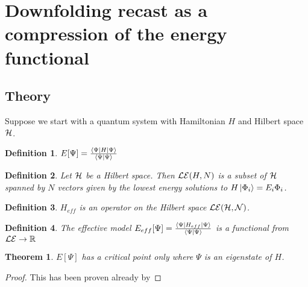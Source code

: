 \newtheorem{theorem}{Theorem}
\newtheorem{definition}{Definition}


\section{Downfolding recast as a compression of the energy functional}

\subsection{Theory} 

Suppose we start with a quantum system with Hamiltonian $H$ and Hilbert space ${\cal H}$.

\begin{definition}
$E[\Psi] = \frac{\bra{\Psi}H\ket{\Psi}}{\braket{\Psi|\Psi}}$
\end{definition}


\begin{definition}
Let ${\cal H}$ be a Hilbert space. Then ${\cal LE}(H,N)$ is a subset of ${\cal H}$ spanned by $N$ vectors given by the lowest energy solutions to $H\ket{\Phi_i}=E_i{\Phi_i}$. 
\end{definition}

\begin{definition}
$H_{eff}$ is an operator on the Hilbert space ${\cal LE(H,N)}$.	 
\end{definition}


\begin{definition}
The effective model $E_{eff}[\Psi]=\frac{\bra{\Psi}H_{eff}\ket{\Psi}}{\braket{\Psi|\Psi}}$ is a functional from ${\cal LE} \rightarrow \mathbb{R}$
\end{definition}



\begin{theorem}
\label{theorem:criticalpoint}
$E[\Psi]$ has a critical point only where $\Psi$ is an eigenstate of $H$.
\end{theorem}
\begin{proof}
This has been proven already by  	
\end{proof}


